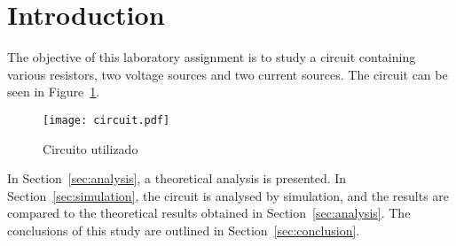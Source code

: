 \section{Introduction}
\label{sec:introduction}

The objective of this laboratory assignment is to study a circuit containing
various resistors, two voltage sources and two current sources. The circuit can be seen in Figure~\ref{fig:circuit}.

\begin{figure}[H] \centering
\texttt{[image: circuit.pdf]}
\caption{Circuito utilizado}
\label{fig:circuit}
\end{figure}

In Section~\ref{sec:analysis}, a theoretical analysis is
presented. In Section~\ref{sec:simulation}, the circuit is analysed by
simulation, and the results are compared to the theoretical results obtained in
Section~\ref{sec:analysis}. The conclusions of this study are outlined in
Section~\ref{sec:conclusion}.


